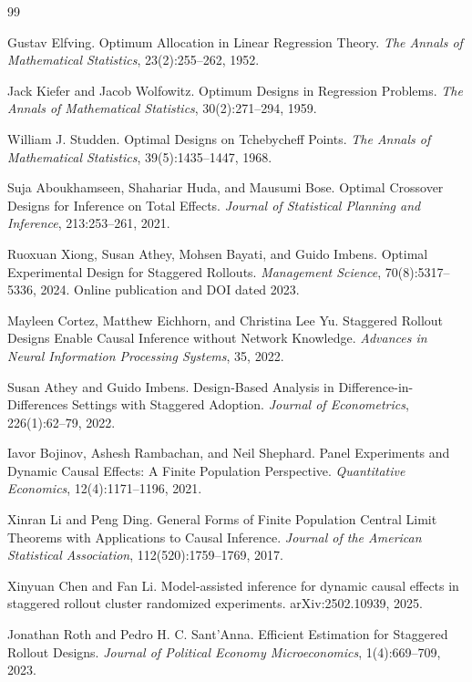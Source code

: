 \documentclass{article}
\begin{document}
\begin{thebibliography}{99}

   Gustav Elfving. Optimum Allocation in Linear Regression Theory. \textit{The Annals of Mathematical Statistics}, 23(2):255--262, 1952.

   Jack Kiefer and Jacob Wolfowitz. Optimum Designs in Regression Problems. \textit{The Annals of Mathematical Statistics}, 30(2):271--294, 1959.

   William J. Studden. Optimal Designs on Tchebycheff Points. \textit{The Annals of Mathematical Statistics}, 39(5):1435--1447, 1968.

   Suja Aboukhamseen, Shahariar Huda, and Mausumi Bose. Optimal Crossover Designs for Inference on Total Effects. \textit{Journal of Statistical Planning and Inference}, 213:253--261, 2021.

   Ruoxuan Xiong, Susan Athey, Mohsen Bayati, and Guido Imbens. Optimal Experimental Design for Staggered Rollouts. \textit{Management Science}, 70(8):5317--5336, 2024. Online publication and DOI dated 2023.

   Mayleen Cortez, Matthew Eichhorn, and Christina Lee Yu. Staggered Rollout Designs Enable Causal Inference without Network Knowledge. \textit{Advances in Neural Information Processing Systems}, 35, 2022.

   Susan Athey and Guido Imbens. Design-Based Analysis in Difference-in-Differences Settings with Staggered Adoption. \textit{Journal of Econometrics}, 226(1):62--79, 2022.

   Iavor Bojinov, Ashesh Rambachan, and Neil Shephard. Panel Experiments and Dynamic Causal Effects: A Finite Population Perspective. \textit{Quantitative Economics}, 12(4):1171--1196, 2021.

   Xinran Li and Peng Ding. General Forms of Finite Population Central Limit Theorems with Applications to Causal Inference. \textit{Journal of the American Statistical Association}, 112(520):1759--1769, 2017.

   Xinyuan Chen and Fan Li. Model-assisted inference for dynamic causal effects in staggered rollout cluster randomized experiments. arXiv:2502.10939, 2025.

   Jonathan Roth and Pedro H. C. Sant'Anna. Efficient Estimation for Staggered Rollout Designs. \textit{Journal of Political Economy Microeconomics}, 1(4):669--709, 2023.


\end{thebibliography}
\end{document}
